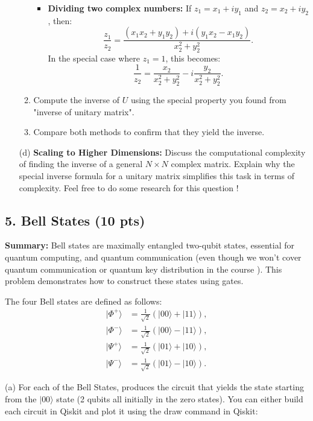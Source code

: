 \documentclass[12pt]{article}
\begin{document}
\begin{enumerate}
\begin{enumerate}
\begin{itemize}
\[            \]
            \item \textbf{Dividing two complex numbers:} If \( z_1 = x_1 + iy_1 \) and \( z_2 = x_2 + iy_2 \), then:
            \[
            \frac{z_1}{z_2} = \frac{(x_1x_2 + y_1y_2) + i(y_1x_2 - x_1y_2)}{x_2^2 + y_2^2}.
            \]
            In the special case where \( z_1 = 1 \), this becomes:
            \[
            \frac{1}{z_2} = \frac{x_2}{x_2^2 + y_2^2} - i\frac{y_2}{x_2^2 + y_2^2}.
            \]
        \end{itemize}
        \item Compute the inverse of \( U \) using the special property you found from "inverse of unitary matrix".
        \item Compare both methods to confirm that they yield the inverse.
    \end{enumerate}

    \item[(d)] \textbf{Scaling to Higher Dimensions:} Discuss the computational complexity of finding the inverse of a general \( N \times N \) complex matrix. Explain why the special inverse formula for a unitary matrix simplifies this task in terms of complexity. Feel free to do some research for this question \smiley{}!
\end{enumerate}

\subsection*{5. Bell States (10 pts)}

\textbf{Summary:} Bell states are maximally entangled two-qubit states, essential for quantum computing,  and quantum communication (even though we won't cover quantum communication or quantum key distribution in the course  \smiley{} ). This problem demonstrates how to construct these states using gates.

The four Bell states are defined as follows:
\begin{align*}
    | \Phi^+ \rangle &= \frac{1}{\sqrt{2}}(|00\rangle + |11\rangle), \\
    | \Phi^- \rangle &= \frac{1}{\sqrt{2}}(|00\rangle - |11\rangle), \\
    | \Psi^+ \rangle &= \frac{1}{\sqrt{2}}(|01\rangle + |10\rangle), \\
    | \Psi^- \rangle &= \frac{1}{\sqrt{2}}(|01\rangle - |10\rangle).
\end{align*}

(a) For each of the Bell States, produces the circuit that yields the state starting from the \(|00\rangle\) state (2 qubits all initially in the zero states). You can either build each circuit in Qiskit and plot it using the draw command in Qiskit:
\\
\end{document}

